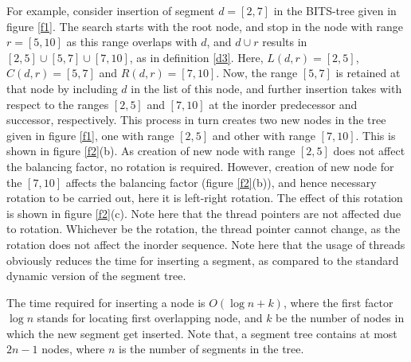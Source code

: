 \documentclass{article}
\begin{document}
For example, consider insertion of segment $d=[2,7]$ in the BITS-tree given in figure \ref{f1}. The search starts with the root node, and stop in the node with range $r=[5,10]$ as this range overlaps with $d$, and $d \cup r$ results in $[2,5]\cup [5,7]\cup [7,10]$, as in definition \ref{d3}. Here, $L(d,r) = [2,5]$, $C(d,r)= [5,7]$ and $R(d,r)= [7,10]$. Now, the range $[5,7]$ is  retained at that node by including $d$ in the list of this node, and further insertion takes with respect to the ranges $[2,5]$ and $[7,10]$ at the inorder predecessor and successor, respectively. This process in turn creates two new nodes in the tree given in figure \ref{f1}, one with range $[2,5]$ and other with range $[7,10]$. This is shown in figure \ref{f2}(b). As creation of new node with range  $[2,5]$ does not affect the balancing factor, no rotation is required. However, creation of new node for the $[7,10]$ affects the balancing factor (figure \ref{f2}(b)), and hence necessary rotation to be carried out, here it is left-right rotation. The effect of this rotation is shown in figure \ref{f2}(c). Note here that the thread pointers are not affected due to rotation. Whichever be the rotation, the thread pointer cannot change, as the rotation does not affect the inorder sequence. Note here that the usage of threads obviously reduces the time for inserting a segment, as compared to the standard dynamic version of the segment tree. \par
The time required for inserting a node is $O(\log n+k)$, where the first factor $\log n$ stands for locating first overlapping node, and $k$ be the number of nodes in which the new segment get inserted.  Note that, a segment tree contains at most $2n-1$ nodes, where $n$ is the number of segments in the tree. 
\end{document}
